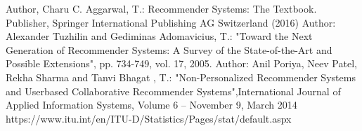 \documentclass[runningheads]{llncs}
\begin{document}


\newpage
\hfill









\newpage

%
%
%
% 
% 
%
\begin{thebibliography}{8}

Author, Charu C. Aggarwal, T.: Recommender Systems: The Textbook. Publisher, Springer International Publishing AG Switzerland (2016)
Author: Alexander Tuzhilin and Gediminas Adomavicius, T.: "Toward the Next Generation of Recommender Systems: A Survey of the State-of-the-Art and Possible Extensions", pp. 734-749, vol. 17, 2005.
Author: Anil Poriya, Neev Patel, Rekha Sharma and Tanvi Bhagat , T.: "Non-Personalized Recommender Systems and Userbased Collaborative Recommender Systems",International Journal of Applied Information Systems, Volume 6 – November 9, March 2014
https://www.itu.int/en/ITU-D/Statistics/Pages/stat/default.aspx 

\end{thebibliography}
\end{document}

